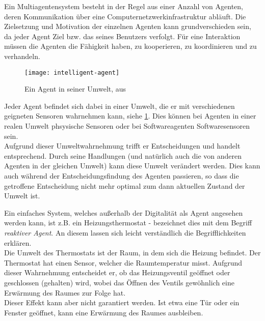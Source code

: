 Ein Multiagentensystem besteht in der Regel aus einer Anzahl von Agenten, deren Kommunikation über eine Computernetzwerkinfrastruktur abläuft.
Die Zielsetzung und Motivation der einzelnen Agenten kann grundverschieden sein, da jeder Agent  Ziel bzw. das seines Benutzers verfolgt.
Für eine Interaktion müssen die Agenten die Fähigkeit haben, zu kooperieren, zu koordinieren und zu verhandeln.

\begin{figure}[hptb]
 \centering
 \texttt{[image: intelligent-agent]}
 \caption[Ein Agent in seiner Umwelt]
 		{Ein Agent in seiner Umwelt, aus \cite{multiagent}}
 \label{figure:intelligent-agent}
\end{figure}
\noindent
Jeder Agent befindet sich dabei in einer Umwelt, die er mit verschiedenen geigneten Sensoren wahrnehmen kann, siehe \cref{figure:intelligent-agent}.
Dies können bei Agenten in einer realen Umwelt phsysische Sensoren oder bei Softwareagenten Softwaresensoren sein.
\\
Aufgrund dieser Umweltwahrnehmung trifft er Entscheidungen und handelt entsprechend.
Durch seine Handlungen (und natürlich auch die von anderen Agenten in der gleichen Umwelt) kann diese Umwelt verändert werden.
Dies kann auch während der Entscheidungsfindung des Agenten passieren, so dass die getroffene Entscheidung nicht mehr optimal zum dann aktuellen Zustand der Umwelt ist.

Ein einfaches System, welches außerhalb der Digitalität als Agent angesehen werden kann, ist z.B. ein Heizungsthermostat - \cite{artificialintelligence} bezeichnet dies mit dem Begriff \textit{reaktiver Agent}.
An diesem lassen sich leicht verständlich die Begrifflichkeiten erklären.
\\
Die Umwelt des Thermostats ist der Raum, in dem sich die Heizung befindet.
Der Thermostat hat einen Sensor, welcher die Raumtemperatur misst.
Aufgrund dieser Wahrnehmung entscheidet er, ob das Heizungsventil geöffnet oder geschlossen (gehalten) wird, wobei das Öffnen des Ventils gewöhnlich eine Erwärmung des Raumes zur Folge hat.
\\
Dieser Effekt kann aber nicht garantiert werden.
Ist etwa eine Tür oder ein Fenster geöffnet, kann eine Erwärmung des Raumes ausbleiben.

